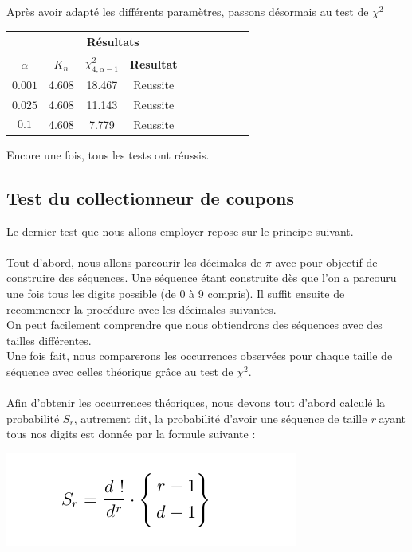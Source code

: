 \documentclass[french]{article}
\begin{document}
Après avoir adapté les différents paramètres, passons désormais au test de $\chi^{2}$
\begin{longtable}{|c|c|c|c|c|c|c|c|c|c|}
	\hline
	& \multicolumn{3}{c|}{\textbf{Résultats}} \\ 
	\hline 
	\textbf{$\alpha$}  & $K_{n}$ & $\chi^{2}_{4,\alpha-1}$ & \textbf{Resultat} \\ 
	\hline 
	$$0.001$$ & 4.608 & 18.467 & Reussite\\ 
	\hline 
	$$0.025$$ & 4.608 & 11.143 & Reussite\\ 
	\hline 
	$$0.1$$ & 4.608 & 7.779 & Reussite \\ 
	\hline 
\end{longtable}

Encore une fois, tous les tests ont réussis.
\\
\subsection{Test du collectionneur de coupons}
Le dernier test que nous allons employer repose sur le principe suivant. 
\\
\\
Tout d'abord, nous allons parcourir les décimales de $\pi$ avec pour objectif de construire des séquences.
Une séquence étant construite dès que l'on a parcouru une fois tous les digits possible (de 0 à 9 compris).
Il suffit ensuite de recommencer la procédure avec les décimales suivantes.
\\
On peut facilement comprendre que nous obtiendrons des séquences avec des tailles différentes.
\\
Une fois fait, nous comparerons les occurrences observées pour chaque taille de séquence avec celles théorique grâce au test de \textbf{$\chi^{2}$}.
\\
\\
Afin d'obtenir les occurrences théoriques, nous devons tout d'abord calculé la probabilité $S_{r}$, autrement dit, la probabilité d'avoir une séquence de taille \textit{r} ayant tous nos digits est donnée par la formule suivante :

	\begin{center}
		\includegraphics[scale=0.40]{Archives/Images/coupons}
	\end{center}
\end{document}
